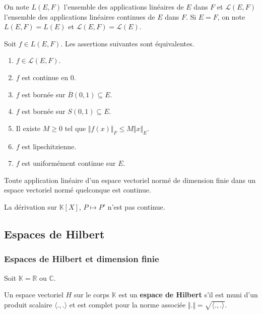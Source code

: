   \begin{notation}
    On note $L(E,F)$ l'ensemble des applications linéaires de $E$ dans $F$ et $\mathcal{L}(E,F)$ l'ensemble des applications linéaires continues de $E$ dans $F$. Si $E = F$, on note $L(E,F) = L(E)$ et $\mathcal{L}(E,F) = \mathcal{L}(E)$.
  \end{notation}

  \begin{theorem}
    Soit $f \in L(E,F)$. Les assertions suivantes sont équivalentes.
    \begin{enumerate}[label=(\roman*)]
      \item $f \in \mathcal{L}(E,F)$.
      \item $f$ est continue en $0$.
      \item $f$ est bornée sur $\overline{B}(0,1) \subseteq E$.
      \item $f$ est bornée sur $S(0,1) \subseteq E$.
      \item Il existe $M \geq 0$ tel que $\Vert f(x) \Vert_F \leq M \Vert x \Vert_E$.
      \item $f$ est lipschitzienne.
      \item $f$ est uniformément continue sur $E$.
    \end{enumerate}
  \end{theorem}

  \begin{proposition}
    Toute application linéaire d'un espace vectoriel normé de dimension finie dans un espace vectoriel normé quelconque est continue.
  \end{proposition}

  \begin{cexample}
    La dérivation sur $\mathbb{K}[X]$, $P \mapsto P'$ n'est pas continue.
  \end{cexample}

  \subsection{Espaces de Hilbert}

  \subsubsection{Espaces de Hilbert et dimension finie}


  Soit $\mathbb{K} = \mathbb{R}$ ou $\mathbb{C}$.

  \begin{definition}
    Un espace vectoriel $H$ sur le corps $\mathbb{K}$ est un \textbf{espace de Hilbert} s'il est muni d'un produit scalaire $\langle . , . \rangle$ et est complet pour la norme associée $\Vert . \Vert = \sqrt{\langle . , . \rangle}$.
  \end{definition}

